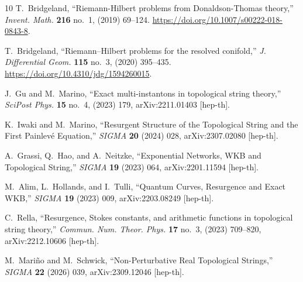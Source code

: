 \documentclass[a4paper,12pt,justification=centering]{article}
\numberwithin{equation}{section}
\providecommand{\href}[2]{#2}
\theoremstyle{plain}%
\theoremstyle{definition}
\begin{document}
\begin{thebibliography}{10}
T.~Bridgeland, ``Riemann-{H}ilbert problems from {D}onaldson-{T}homas theory,''
  \href{http://dx.doi.org/10.1007/s00222-018-0843-8}{{\em Invent. Math.}
  {\bfseries 216} no.~1, (2019) 69--124}.
  \url{https://doi.org/10.1007/s00222-018-0843-8}.

T.~Bridgeland, ``Riemann--{H}ilbert problems for the resolved conifold,''
  \href{http://dx.doi.org/10.4310/jdg/1594260015}{{\em J. Differential Geom.}
  {\bfseries 115} no.~3, (2020) 395--435}.
  \url{https://doi.org/10.4310/jdg/1594260015}.

J.~Gu and M.~Marino, ``{Exact multi-instantons in topological string theory},''
  \href{http://dx.doi.org/10.21468/SciPostPhys.15.4.179}{{\em SciPost Phys.}
  {\bfseries 15} no.~4, (2023) 179},
  \href{http://arxiv.org/abs/2211.01403}{{\ttfamily arXiv:2211.01403
  [hep-th]}}.

K.~Iwaki and M.~Marino, ``{Resurgent Structure of the Topological String and
  the First Painlev\'e Equation},''
  \href{http://dx.doi.org/10.3842/SIGMA.2024.028}{{\em SIGMA} {\bfseries 20}
  (2024) 028}, \href{http://arxiv.org/abs/2307.02080}{{\ttfamily
  arXiv:2307.02080 [hep-th]}}.

A.~Grassi, Q.~Hao, and A.~Neitzke, ``{Exponential Networks, WKB and Topological
  String},'' \href{http://dx.doi.org/10.3842/SIGMA.2023.064}{{\em SIGMA}
  {\bfseries 19} (2023) 064}, \href{http://arxiv.org/abs/2201.11594}{{\ttfamily
  arXiv:2201.11594 [hep-th]}}.

M.~Alim, L.~Hollands, and I.~Tulli, ``{Quantum Curves, Resurgence and Exact
  WKB},'' \href{http://dx.doi.org/10.3842/SIGMA.2023.009}{{\em SIGMA}
  {\bfseries 19} (2023) 009}, \href{http://arxiv.org/abs/2203.08249}{{\ttfamily
  arXiv:2203.08249 [hep-th]}}.

C.~Rella, ``{Resurgence, Stokes constants, and arithmetic functions in
  topological string theory},''
  \href{http://dx.doi.org/10.4310/CNTP.2023.v17.n3.a4}{{\em Commun. Num. Theor.
  Phys.} {\bfseries 17} no.~3, (2023) 709--820},
  \href{http://arxiv.org/abs/2212.10606}{{\ttfamily arXiv:2212.10606
  [hep-th]}}.

M.~Mari{\~n}o and M.~Schwick, ``{Non-Perturbative Real Topological Strings},''
  \href{http://dx.doi.org/10.3842/SIGMA.2026.039}{{\em SIGMA} {\bfseries 22}
  (2026) 039}, \href{http://arxiv.org/abs/2309.12046}{{\ttfamily
  arXiv:2309.12046 [hep-th]}}.


\end{thebibliography}
\end{document}

